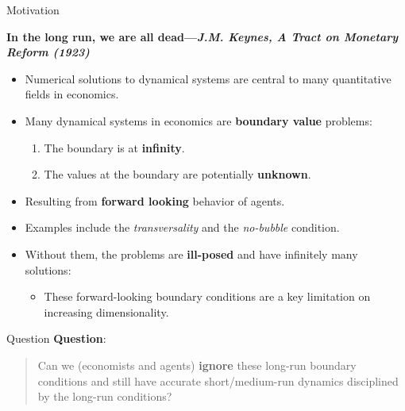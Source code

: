 \documentclass[aspectratio=169,10pt]{beamer}
\newcommand{\emphcolor}[1]{\textbf{\textcolor{emphcolorval}{#1}}}
\begin{document}
\begin{frame}{Motivation}
	\begin{center}
		\emphcolor{In the long run, we are all dead---{\it J.M. Keynes, A Tract on Monetary Reform (1923)}}
	\end{center}
	\begin{itemize}
		\item Numerical solutions to dynamical systems are central to many quantitative fields in economics.
		\vspace{0.1in}
		\item Many dynamical systems in economics are \emphcolor{boundary value} problems:
		\vspace{0.1in}
		\begin{enumerate}
				\item The boundary is at \emphcolor{infinity}.
				\vspace{0.05in}
				\item The values at the boundary are potentially \emphcolor{unknown}.
				\vspace{0.05in}  
		\end{enumerate}
		\item Resulting from \emphcolor{forward looking} behavior of agents.
		\vspace{0.1in}
		\item Examples include the \emph{{\it transversality}} and the \emph{\it  no-bubble} condition.
		\vspace{0.1in}
		\item Without them, the problems are \emphcolor{ill-posed} and have infinitely many solutions: 
		\vspace{0.1in}
		\begin{itemize}
			\item These forward-looking boundary conditions are a key limitation on increasing dimensionality.
		\end{itemize}
	\end{itemize}
\end{frame}


\begin{frame}{Question}
	\emphcolor{Question}:
	\hspace{200mm}
	
	\begin{quote}
			Can we (economists and agents) \emphcolor{ignore} these long-run boundary conditions and still have accurate short/medium-run dynamics disciplined by the long-run conditions?
	\end{quote}
\end{frame}
\end{document}
